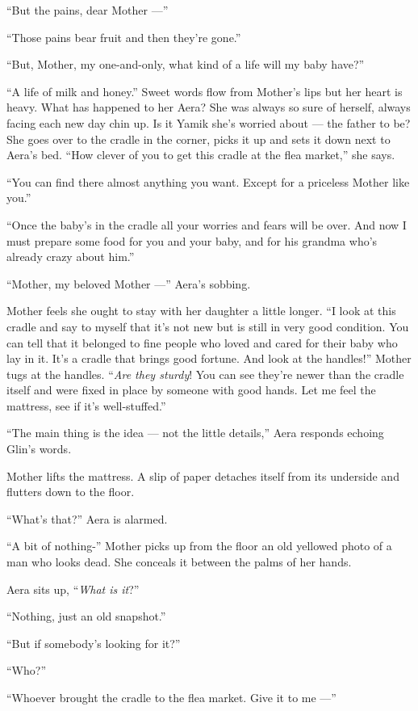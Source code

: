 \documentclass[twoside,11pt,openany]{book}
\begin{document}
``But the pains, dear Mother ---''

``Those pains bear fruit and then they're gone.''

``But, Mother, my one-and-only, what kind of a life will my baby have?''

``A life of milk and honey.'' Sweet words flow from Mother's lips but her heart is heavy. What
has happened to her Aera? She was always so sure of herself, always facing each new day chin up. Is it Yamik she's
worried about --- the father to be? She goes over to the cradle in the corner, picks it up and sets it down next to
Aera's bed. ``How clever of you to get this cradle at the flea market,'' she says.

``You can find there almost anything you want. Except for a priceless Mother like you.''

``Once the baby's in the cradle all your worries and fears will be over. And now I must prepare some food
for you and your baby, and for his grandma who's already crazy about him.''

``Mother, my beloved Mother ---'' Aera's  sobbing.

Mother feels she ought to stay with her daughter a little longer. ``I look at this cradle and say to myself
that it's not new but is{ }still in very good condition. You can tell that it belonged to fine people
who loved and cared for their baby who lay in it. It's a cradle that brings good fortune. And look at the
handles!'' Mother tugs at the handles. ``\textit{Are they sturdy}! You can see they're newer
than the cradle itself and were fixed in place by someone with good hands. Let me feel the mattress, see if it's
well-stuffed.''

``The main thing is the idea --- not the little details,'' Aera responds echoing Glin's words.

Mother lifts the mattress. A slip of paper detaches itself from its underside and{ }flutters down to the
floor.

``What's that?'' Aera is alarmed.

``A bit of nothing-'' Mother picks up from the floor an old yellowed photo of a man who looks dead. She
conceals{ }it between the palms of her hands.

Aera sits up, ``\textit{What is it}?''

``Nothing, just an old snapshot.''

``But if somebody's looking for it?''

``Who?''

``Whoever brought the cradle to the flea market. Give it to me ---''
\end{document}
